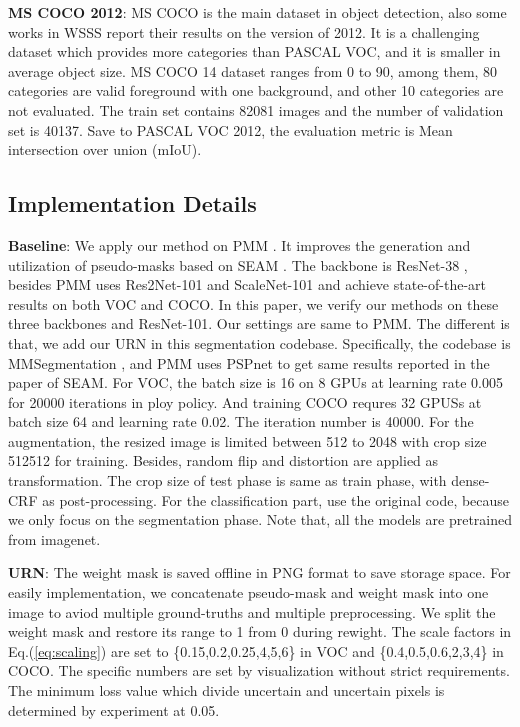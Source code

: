 \noindent \textbf{MS COCO 2012}: MS COCO is the main dataset in object detection, also some works in WSSS report their results on the version of 2012. It is a challenging dataset which provides more categories than PASCAL VOC, and it is smaller in average object size. MS COCO 14 dataset ranges from 0 to 90, among them, 80 categories are valid foreground with one background, and other 10 categories are not evaluated. The train set contains 82081 images and the number of validation set is 40137. Save to PASCAL VOC 2012, the evaluation metric is Mean intersection over union (mIoU).


\subsection{Implementation Details}
\noindent \textbf{Baseline}: We apply our method on PMM \cite{li2021pseudo}. It improves the generation and utilization of pseudo-masks based on SEAM \cite{Wang_2020_CVPR}. The backbone is ResNet-38 \cite{wu2019wider}, besides PMM uses Res2Net-101 \cite{gao2019res2net} and ScaleNet-101 \cite{li2019data} and achieve state-of-the-art results on both VOC and COCO. In this paper, we verify our methods on these three backbones and ResNet-101\cite{he2016deep}. Our settings are same to PMM. The different is that, we add our URN in this segmentation codebase. Specifically, the codebase is MMSegmentation \cite{mmseg2020}, and PMM uses PSPnet \cite{zhao2017pyramid} to get same results reported in the paper of SEAM. For VOC, the batch size is 16 on 8 GPUs at learning rate 0.005 for 20000 iterations in ploy policy. And training COCO requres 32 GPUSs at batch size 64 and learning rate 0.02. The iteration number is 40000. For the augmentation, the resized image is limited between 512 to 2048 with crop size 512512 for training. Besides, random flip and distortion are applied as transformation. The crop size of test phase is same as train phase, with dense-CRF as post-processing. For the classification part, use the original code, because we only focus on the segmentation phase. Note that, all the models are pretrained from imagenet.

\noindent \textbf{URN}: The weight mask is saved offline in PNG format to save storage space. For easily implementation, we concatenate pseudo-mask and weight mask into one image to aviod multiple ground-truths and multiple preprocessing. We split the weight mask and restore its range to 1 from 0 during rewight.
The scale factors  in Eq.(\ref{eq:scaling}) are set to \{0.15,0.2,0.25,4,5,6\} in VOC and \{0.4,0.5,0.6,2,3,4\} in COCO. The specific numbers are set by visualization without strict requirements. The minimum loss value  which divide uncertain and uncertain pixels is determined by experiment at 0.05.

